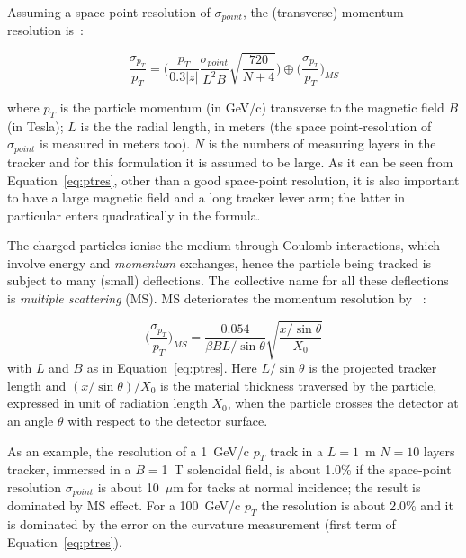 Assuming a space point-resolution of $\sigma_{point}$, the (transverse) momentum resolution is~\cite{GLUCKSTERN1963381,Olive:2016xmw,Garcia-Sciveres:2017ymt}:

\begin{equation}
\dfrac{\sigma_{p_{T}}}{p_{T}} = \Bigg( \dfrac{p_T}{0.3|z|}\dfrac{\sigma_{point}}{L^2B}\sqrt{\dfrac{720}{N+4}}\Bigg) \oplus \Bigg(\dfrac{\sigma_{p_{T}}}{p_{T}}\Bigg)_{MS}
\label{eq:ptres}
\end{equation} 

where $p_T$ is the particle momentum (in GeV/c) transverse to the magnetic field $B$ (in Tesla); 
$L$ is the the radial length, in meters (the space point-resolution of $\sigma_{point}$ is measured in 
meters too). $N$ is the numbers of measuring layers in the tracker and for this formulation it is 
assumed to be large. As it can be seen from Equation~\ref{eq:ptres}, other than a good 
space-point resolution, it is also important to have a large magnetic field and a long tracker lever 
arm; the latter in particular enters quadratically in the formula. 

The charged particles ionise the medium through Coulomb interactions, which involve energy and 
{\it momentum} exchanges, hence the particle being tracked is subject to many (small) deflections. 
The collective name for all these deflections is {\it multiple scattering} (MS). MS deteriorates the 
momentum resolution by ~\cite{Garcia-Sciveres:2017ymt}:

\begin{equation}
\Bigg(\dfrac{\sigma_{p_{T}}}{p_{T}}\Bigg)_{MS} = \dfrac{0.054}{\beta B L/\sin\theta}\sqrt{\dfrac{x/\sin\theta}{X_0}}
\label{eq:MS}
\end{equation} 
with $L$ and $B$ as in Equation~\ref{eq:ptres}. Here $L/\sin\theta$ is the projected tracker length
 and $(x/\sin\theta)/X_0$ is the material thickness traversed by the particle, expressed in unit 
 of radiation length $X_0$, when the particle crosses the detector at an angle $\theta$ with respect 
 to the detector surface.
 
 As an example, the resolution of a 1~GeV/c $p_T$ track in a $L=1$~m 
 $N=10$ layers 
 tracker, immersed in a $B=$1~T solenoidal field, is about 1.0\% if the space-point resolution   
 $\sigma_{point}$ is about 10~$\mu$m for tacks at normal incidence; the result is dominated by 
 MS effect. For a 100~GeV/c $p_T$ the resolution is about 2.0\% and it is dominated by the 
 error on the curvature measurement (first term of Equation~\ref{eq:ptres}).

